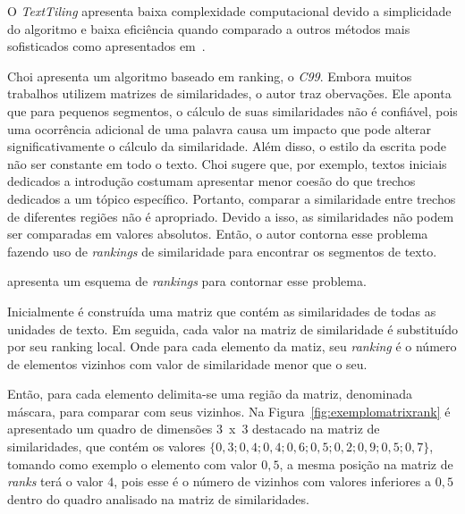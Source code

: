 

O \textit{TextTiling} apresenta baixa complexidade computacional devido a simplicidade do algoritmo e baixa eficiência quando comparado a outros métodos mais sofisticados como apresentados em~\cite{Choi2000, Kern2009, Misra2009}.




Choi \cite{Choi2000} apresenta um algoritmo baseado em ranking, o \textit{C99}. 
%
Embora muitos trabalhos utilizem matrizes de similaridades, o autor traz obervações.
%
Ele aponta que para pequenos segmentos, o cálculo de suas similaridades não é confiável, pois uma ocorrência adicional de uma palavra causa um impacto que pode alterar significativamente o cálculo da similaridade.
%
Além disso, o estilo da escrita pode não ser constante em todo o texto. Choi sugere que, por exemplo, textos iniciais dedicados a introdução costumam apresentar menor coesão do que trechos dedicados a um tópico específico. Portanto, comparar a similaridade entre trechos de diferentes regiões não é apropriado.
Devido a isso, as similaridades não podem ser comparadas em valores absolutos. Então, o autor contorna esse problema fazendo uso de \textit{rankings} de similaridade para encontrar os segmentos de texto. 

apresenta um esquema de \textit{rankings} para contornar esse problema.


%





Inicialmente é construída uma matriz que contém as similaridades de todas as unidades de texto. Em seguida, cada valor na matriz de similaridade é substituído por seu ranking local. Onde para cada elemento da matiz, seu \textit{ranking} é o número de elementos vizinhos com valor de similaridade menor que o seu.%

Então, para cada elemento delimita-se uma região da matriz, denominada máscara, para comparar com seus vizinhos.
%
Na Figura~\ref{fig:exemplomatrixrank} é apresentado um quadro de dimensões 3~x~3 destacado na matriz de similaridades, que contém os valores  $\{0,3; 0,4; 0,4; 0,6; 0,5; 0,2; 0,9; 0,5; 0,7\}$, tomando como exemplo o elemento com valor $0,5$, a mesma posição na matriz de \textit{ranks} terá o valor $4$, pois esse é o número de vizinhos com valores inferiores a $0,5$ dentro do quadro analisado na matriz de similaridades. 


